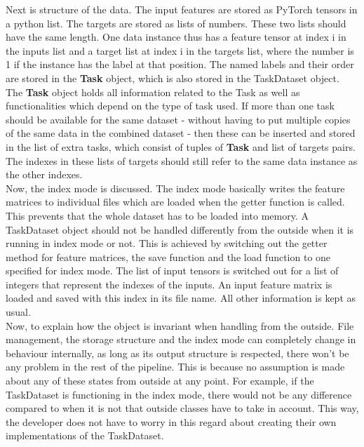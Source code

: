 Next is structure of the data. The input features are stored as PyTorch tensors in a python list. The targets are stored as lists of numbers. These two lists should have the same length. One data instance thus has a feature tensor at index i in the inputs list and a target list at index i in the targets list, where the number is 1 if the instance has the label at that position. The named labels and their order are stored in the \textbf{Task} object, which is also stored in the TaskDataset object. The \textbf{Task} object holds all information related to the Task as well as functionalities which depend on the type of task used. If more than one task should be available for the same dataset - without having to put multiple copies of the same data in the combined dataset - then these can be inserted and stored in the list of extra tasks, which consist of tuples of \textbf{Task} and list of targets pairs. The indexes in these lists of targets should still refer to the same data instance as the other indexes. \\

Now, the index mode is discussed. The index mode basically writes the feature matrices to individual files which are loaded when the getter function is called. This prevents that the whole dataset has to be loaded into memory. A TaskDataset object should not be handled differently from the outside when it is running in index mode or not. This is achieved by switching out the getter method for feature matrices, the save function and the load function to one specified for index mode. The list of input tensors is switched out for a list of integers that represent the indexes of the inputs. An input feature matrix is loaded and saved with this index in its file name. All other information is kept as usual. \\

Now, to explain how the object is invariant when handling from the outside. File management, the storage structure and the index mode can completely change in behaviour internally, as long as its output structure is respected, there won't be any problem in the rest of the pipeline. This is because no assumption is made about any of these states from outside at any point. For example, if the TaskDataset is functioning in the index mode, there would not be any difference compared to when it is not that outside classes have to take in account. This way, the developer does not have to worry in this regard about creating their own implementations of the TaskDataset. \\

